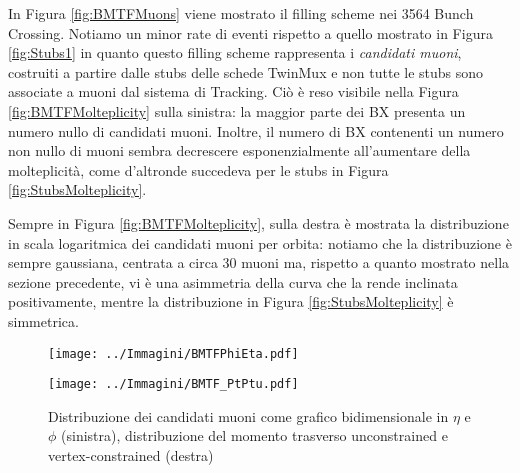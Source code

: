 In Figura \ref{fig:BMTFMuons} viene mostrato il filling scheme nei 3564 Bunch Crossing. Notiamo un minor rate di eventi rispetto a quello mostrato in Figura \ref{fig:Stubs1} in quanto questo filling scheme rappresenta i \textit{candidati muoni}, costruiti a partire dalle stubs delle schede TwinMux e non tutte le stubs sono associate a muoni dal sistema di Tracking. Ciò è reso visibile nella Figura \ref{fig:BMTFMolteplicity} sulla sinistra: la maggior parte dei BX presenta un numero nullo di candidati muoni. Inoltre, il numero di BX contenenti un numero non nullo di muoni sembra decrescere esponenzialmente all’aumentare della molteplicità, come d'altronde succedeva per le stubs in Figura \ref{fig:StubsMolteplicity}.

Sempre in Figura \ref{fig:BMTFMolteplicity}, sulla destra è mostrata la distribuzione in scala logaritmica dei candidati muoni per orbita: notiamo che la distribuzione è sempre gaussiana, centrata a circa 30 muoni ma, rispetto a quanto mostrato nella sezione precedente, vi è una asimmetria della curva che la rende inclinata positivamente, mentre la distribuzione in Figura \ref{fig:StubsMolteplicity} è simmetrica.

\begin{figure}[t]
  \centering
  \begin{minipage}[b]{0.51\textwidth}
    \centering
    \texttt{[image: ../Immagini/BMTFPhiEta.pdf]} 
    \end{minipage}
    \hfill 
    \begin{minipage}[b]{0.48\textwidth}
      \centering
      \texttt{[image: ../Immagini/BMTF\_PtPtu.pdf]} 
    \end{minipage}
    \caption{Distribuzione dei candidati muoni come grafico bidimensionale in $\eta$ e $\phi$ (sinistra), distribuzione del momento trasverso unconstrained e vertex-constrained (destra)}
  \label{fig:BMTFPt}
\end{figure}


